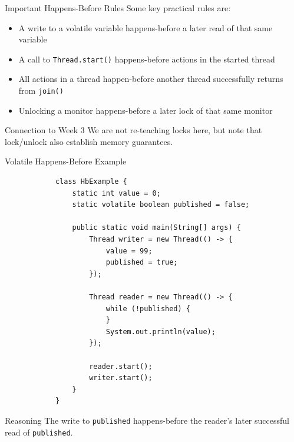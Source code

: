 \documentclass[aspectratio=169,11pt]{beamer}
\begin{document}
	\begin{frame}{Important Happens-Before Rules}
		Some key practical rules are:
		
		\begin{itemize}
			\item A write to a volatile variable happens-before a later read of that same variable
			\item A call to \texttt{Thread.start()} happens-before actions in the started thread
			\item All actions in a thread happen-before another thread successfully returns from \texttt{join()}
			\item Unlocking a monitor happens-before a later lock of that same monitor
		\end{itemize}
		
		\vspace{0.3cm}
		
		\begin{exampleblock}{Connection to Week 3}
			We are not re-teaching locks here, but note that lock/unlock also establish memory guarantees.
		\end{exampleblock}
	\end{frame}
	
	\begin{frame}[fragile]{Volatile Happens-Before Example}
		\begin{lstlisting}
			class HbExample {
				static int value = 0;
				static volatile boolean published = false;
				
				public static void main(String[] args) {
					Thread writer = new Thread(() -> {
						value = 99;
						published = true;
					});
					
					Thread reader = new Thread(() -> {
						while (!published) {
						}
						System.out.println(value);
					});
					
					reader.start();
					writer.start();
				}
			}
		\end{lstlisting}
		
		\vspace{0.2cm}
		
		\begin{block}{Reasoning}
			The write to \texttt{published} happens-before the reader's later successful read of \texttt{published}.
		\end{block}
	\end{frame}
	
\end{document}
